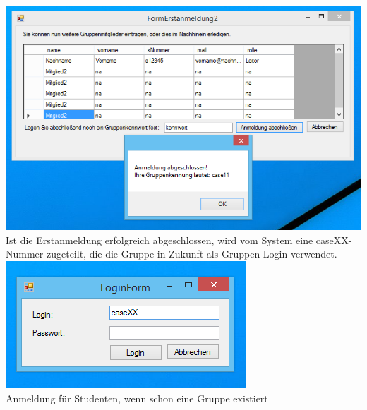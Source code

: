 \documentclass{article}
\begin{document}
\begin{center}
    \includegraphics[scale=0.8]{bilder/pic7.PNG}\\
    Ist die Erstanmeldung erfolgreich abgeschlossen, wird vom System eine caseXX-Nummer zugeteilt, die die Gruppe in Zukunft als Gruppen-Login verwendet. \\
    
    \includegraphics{bilder/pic2.PNG}\\
    Anmeldung für Studenten, wenn schon eine Gruppe existiert \\
\end{center}
\end{document}
